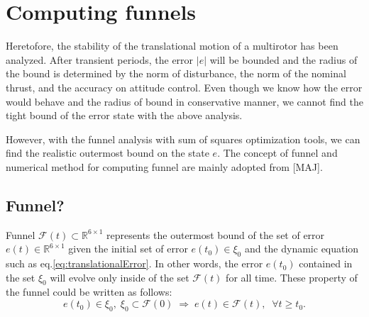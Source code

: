 \documentclass[letterpaper, 10 pt, conference]{ieeeconf}  %
\begin{document}
\section{Computing funnels}
Heretofore, the stability of the translational motion of a multirotor has been analyzed. 
After transient periods, the error $|e|$ will be bounded and the radius of the bound is determined by the norm of disturbance, the norm of the nominal thrust, and the accuracy on attitude control. 
Even though we know how the error would behave and the radius of bound in conservative manner, we cannot find the tight bound of the error state with the above analysis. 

However, with the funnel analysis with sum of squares optimization tools, we can find the realistic outermost bound on the state $e$.
The concept of funnel and numerical method for computing funnel are mainly adopted from [MAJ]. 
\subsection{Funnel?}
Funnel $\mathcal{F}(t) \subset \mathbb{R}^{6\times 1}$  represents the outermost bound of the set of error $e(t)\in \mathbb{R}^{6\times 1}$ given the initial set of error $e(t_0) \in \xi_0$ and the dynamic equation such as eq.\eqref{eq:translationalError}.
In other words, the error $e(t_0)$ contained in the set $\xi_0$ will evolve only inside of the set $\mathcal{F}(t)$ for all time.
These property of the funnel could be written as follows:
\begin{equation}
e(t_0) \in \xi_0,\;\xi_0 \subset \mathcal{F}(0)\;\Rightarrow\; e(t) \in \mathcal{F}(t),\;\;\forall t \geq t_0. \label{eq:funnel1}
\end{equation}
\end{document}
